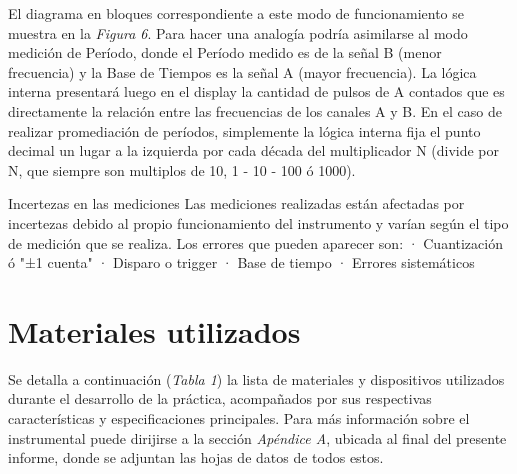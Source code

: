 \documentclass{article}
\begin{document}
	El diagrama en bloques correspondiente a este modo de funcionamiento se muestra en la \textit{Figura 6}. Para hacer una analogía podría asimilarse al modo medición de Período, donde el Período medido es de la señal B (menor frecuencia) y la Base de Tiempos es la señal A (mayor frecuencia). La lógica interna presentará luego en el display la cantidad de pulsos de A contados que es directamente la relación entre las frecuencias de los canales A y B. En el caso de realizar promediación de períodos, simplemente la lógica interna fija el punto decimal un lugar a la izquierda por cada década del multiplicador N (divide por N, que siempre son multiplos de 10, 1 - 10 - 100 ó 1000).
\bigskip\bigskip


	
	Incertezas en las mediciones
	\medskip
		Las mediciones realizadas están afectadas por incertezas debido al propio funcionamiento del instrumento y varían según el tipo de medición que se realiza.
		\medskip
		Los errores que pueden aparecer son:
			· Cuantización ó "±1 cuenta"
			· Disparo o trigger
			· Base de tiempo
			· Errores sistemáticos
	
\bigskip\bigskip




\section{Materiales utilizados}

	Se detalla a continuación (\textit{Tabla 1}) la lista de materiales y dispositivos utilizados durante el desarrollo de la práctica, acompañados por sus respectivas características y especificaciones principales. Para más información sobre el instrumental puede dirijirse a la sección \textit{Apéndice A}, ubicada al final del presente informe, donde se adjuntan las hojas de datos de todos estos.
\bigskip\bigskip
\end{document}
